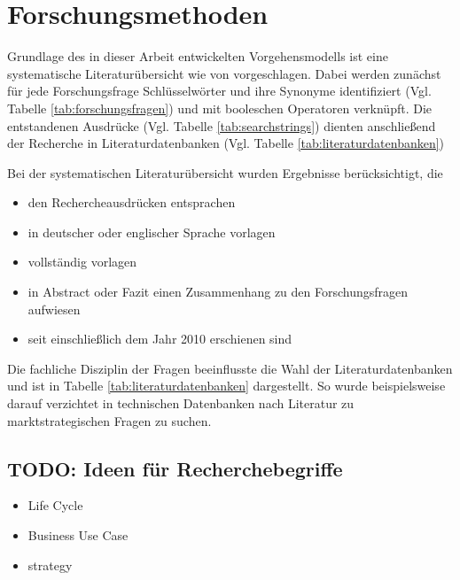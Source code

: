 \section{Forschungsmethoden}
\label{cha:method}
Grundlage des in dieser Arbeit entwickelten Vorgehensmodells ist eine
systematische Literaturübersicht wie von 
vorgeschlagen. Dabei werden zunächst für jede Forschungsfrage Schlüsselwörter
und ihre Synonyme identifiziert (Vgl. Tabelle
\ref{tab:forschungsfragen}) und mit booleschen Operatoren
verknüpft. Die entstandenen Ausdrücke (Vgl. Tabelle
\ref{tab:searchstrings}) dienten anschließend der Recherche in
Literaturdatenbanken (Vgl. Tabelle \ref{tab:literaturdatenbanken})


Bei der systematischen Literaturübersicht wurden Ergebnisse berücksichtigt, die
\begin{itemize}
	\item den Rechercheausdrücken entsprachen
	\item in deutscher oder englischer Sprache vorlagen
	\item vollständig vorlagen
	\item in Abstract oder Fazit einen Zusammenhang zu den Forschungsfragen
aufwiesen
	\item seit einschließlich dem Jahr 2010 erschienen sind
\end{itemize}

Die fachliche Disziplin der Fragen beeinflusste die Wahl der
Literaturdatenbanken und ist in Tabelle \ref{tab:literaturdatenbanken}
dargestellt. So wurde beispielsweise darauf verzichtet in technischen
Datenbanken nach Literatur zu marktstrategischen Fragen zu suchen.



\subsection{TODO: Ideen für Recherchebegriffe}
\begin{itemize}
	\item Life Cycle
	\item Business Use Case
	\item strategy
\end{itemize}


\begin{comment}
In diesem Kapitel erläutern Sie ihre Forschungsmethode unter Verwendung von
entsprechenden Quellen.
Begründen Sie auch, warum Sie sich für diese Forschungsmethode entschieden
haben
und warum sie geeignet ist, die vorliegende Forschungsfrage zu beantworten.
\end{comment}
